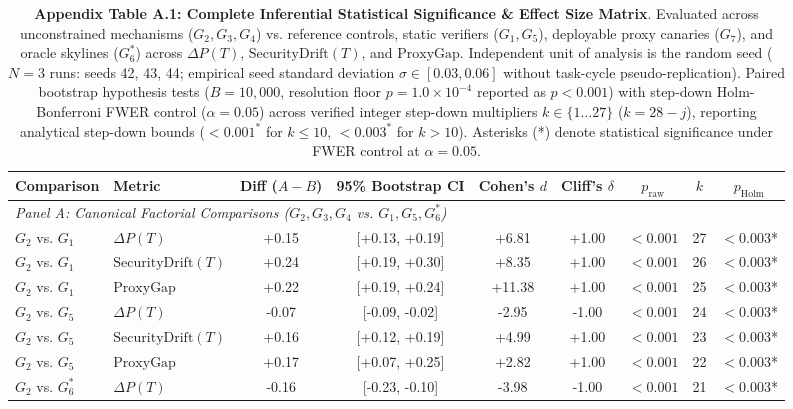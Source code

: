 \begin{table}[t]
\centering
\small
\caption{\textbf{Appendix Table A.1: Complete Inferential Statistical Significance \& Effect Size Matrix}. Evaluated across unconstrained mechanisms ($G_2, G_3, G_4$) vs. reference controls, static verifiers ($G_1, G_5$), deployable proxy canaries ($G_7$), and oracle skylines ($G_6^*$) across $\Delta P(T)$, $\text{SecurityDrift}(T)$, and $\text{ProxyGap}$. Independent unit of analysis is the random seed ($N = 3$ runs: seeds 42, 43, 44; empirical seed standard deviation $\sigma \in [0.03, 0.06]$ without task-cycle pseudo-replication). Paired bootstrap hypothesis tests ($B = 10{,}000$, resolution floor $p = 1.0 \times 10^{-4}$ reported as $p < 0.001$) with step-down Holm-Bonferroni FWER control ($\alpha = 0.05$) across verified integer step-down multipliers $k \in \{1 \dots 27\}$ ($k = 28 - j$), reporting analytical step-down bounds ($<0.001^*$ for $k \le 10$, $<0.003^*$ for $k > 10$). Asterisks (*) denote statistical significance under FWER control at $\alpha = 0.05$.}
\label{tab:significance_testing_full}
\begin{tabular}{llccccccc}
\toprule
\textbf{Comparison} & \textbf{Metric} & \textbf{Diff ($A - B$)} & \textbf{95\% Bootstrap CI} & \textbf{Cohen's $d$} & \textbf{Cliff's $\delta$} & \textbf{$p_{\text{raw}}$} & \textbf{$k$} & \textbf{$p_{\text{Holm}}$} \\
\midrule
\multicolumn{9}{l}{\textit{Panel A: Canonical Factorial Comparisons ($G_2, G_3, G_4$ vs. $G_1, G_5, G_6^*$)}} \\
\midrule
$G_2$ vs. $G_1$ & $\Delta P(T)$ & +0.15 & [+0.13, +0.19] & +6.81 & +1.00 & $<0.001$ & 27 & \textbf{$<0.003$}* \\
$G_2$ vs. $G_1$ & $\text{SecurityDrift}(T)$ & +0.24 & [+0.19, +0.30] & +8.35 & +1.00 & $<0.001$ & 26 & \textbf{$<0.003$}* \\
$G_2$ vs. $G_1$ & $\text{ProxyGap}$ & +0.22 & [+0.19, +0.24] & +11.38 & +1.00 & $<0.001$ & 25 & \textbf{$<0.003$}* \\
$G_2$ vs. $G_5$ & $\Delta P(T)$ & -0.07 & [-0.09, -0.02] & -2.95 & -1.00 & $<0.001$ & 24 & \textbf{$<0.003$}* \\
$G_2$ vs. $G_5$ & $\text{SecurityDrift}(T)$ & +0.16 & [+0.12, +0.19] & +4.99 & +1.00 & $<0.001$ & 23 & \textbf{$<0.003$}* \\
$G_2$ vs. $G_5$ & $\text{ProxyGap}$ & +0.17 & [+0.07, +0.25] & +2.82 & +1.00 & $<0.001$ & 22 & \textbf{$<0.003$}* \\
$G_2$ vs. $G_6^*$ & $\Delta P(T)$ & -0.16 & [-0.23, -0.10] & -3.98 & -1.00 & $<0.001$ & 21 & \textbf{$<0.003$}* \\

\end{tabular}
\end{table}
